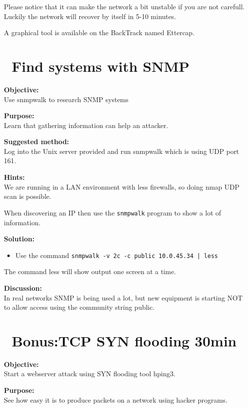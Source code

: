 \documentclass[a4paper,11pt,notitlepage]{report}
\begin{document}
Please notice that it can make the network a bit unstable if you are not carefull. Luckily the network will recover by itself in 5-10 minutes.

A graphical tool is available on the BackTrack named Ettercap.

\chapter{\faInfoCircle\ Find systems with SNMP}
\label{ex:find-snmp}

{\bf Objective:}\\
Use snmpwalk to research SNMP systems

{\bf Purpose:}\\
Learn that gathering information can help an attacker.

{\bf Suggested method:} \\
Log into the Unix server provided and run snmpwalk which is using UDP port 161.

{\bf Hints:} \\
We are running in a LAN environment with less firewalls, so doing nmap UDP scan is possible.

When discovering an IP then use the \verb+snmpwalk+
  program to show a lot of information.


{\bf Solution:}\\
\begin{itemize}
\item Use the command \verb+snmpwalk -v 2c -c public 10.0.45.34 | less +\\
\end{itemize}

The command less will show output one screen at a time.

{\bf Discussion:}\\
In real networks SNMP is being used a lot, but new equipment is starting NOT to allow access using the community string public.

\chapter{\faInfoCircle\ Bonus:TCP SYN flooding 30min}
\label{ex:syn-flood}

{\bf Objective:}\\
Start a webserver attack using SYN flooding tool hping3.

{\bf Purpose:}\\
See how easy it is to produce packets on a network using hacker programs.
\end{document}
